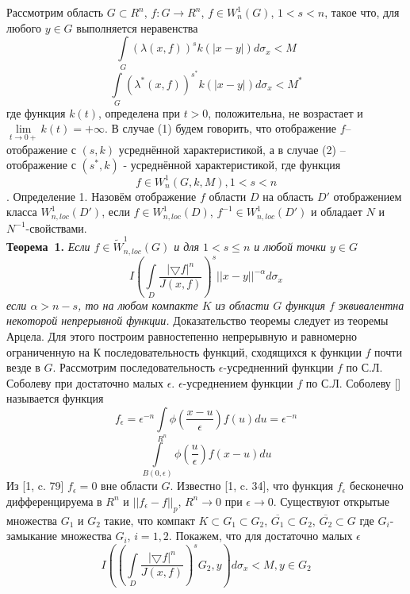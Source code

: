 Рассмотрим область $G\subset R^n$, $f:G\to R^n$, $f\in W^{1}_{n}(G)$, $1<s<n$, такое что, для любого $y\in G$ выполняется неравенства
\begin{equation}
\int\limits_{G}(\lambda(x,f))^{s}k(|x-y|)d\sigma_{x}<M
\end{equation}
\begin{equation}
\int\limits_{G}(\lambda^{*}(x,f))^{s^{*}}k(|x-y|)d\sigma_{x}<M^{*}
\end{equation}
где функция $k(t)$, определена при $t>0$, положительна, не возрастает и $\lim\limits_{t\to 0+}k(t)=+\infty$. В случае (1) будем говорить, что отображение $f$– отображение с $(s,k)$ усреднённой характеристикой, а в случае (2) – отображение с $(s^{*},k)$ - усреднённой характеристикой, где функция $$f\in W^{1}_{n}(G,k,M), 1<s<n$$.
Определение 1. Назовём отображение $f$ области $D$ на область $D'$ отображением класса $W^{1}_{n,loc}(D')$, если $f \in W^{1}_{n,loc}(D)$, $f^{-1} \in W^{1}_{n,loc}(D')$ и обладает $N$ и $N^{-1}$-свойствами.\\
\textbf{Теорема~1.} {\it Если $f\in\widetilde{W}_{n,loc}^1(G) $ и для $1<s\leq n$ и любой точки $y\in G$
\begin{equation}
I\left(
\int\limits_D\frac{|\bigtriangledown f|^{n}}{J(x,f)}
\right)^{s}||x-y||^{-\alpha}d\sigma_{x}
\end{equation}
если $\alpha>n-s$, то на любом компакте $K$ из области $G$ функция $f$ эквивалентна некоторой непрерывной функции.} Доказательство теоремы следует из теоремы Арцела. Для этого построим равностепенно непрерывную и равномерно ограниченную на $К$ последовательность функций, сходящихся к функции $f$ почти везде в $G$. Рассмотрим последовательность $\epsilon$-усредненний функции $f$ по С.Л. Соболеву при достаточно малых $\epsilon$. $\epsilon$-усреднением функции $f$ по С.Л. Соболеву [] называется функция
$$
f_{\epsilon}=\epsilon^{-n}\int\limits_{R^n}\phi\left(\frac{x-u}{\epsilon}\right)f(u)du=\epsilon^{-n}$$
$$\int\limits_{B(0,\epsilon)}\phi\left(\frac{u}{\epsilon}\right)f(x-u)du
$$
Из [1, c. 79] $f_{\epsilon}=0$ вне области $G$. Известно [1, c. 34], что функция $f_{\epsilon}$ бесконечно дифференцируема в $R^n$ и $||f_{\epsilon}-f||_p$, $R^{n}\to 0$ при $\epsilon\to 0$. Существуют открытые множества $G_1$ и $G_2$ такие, что компакт $K\subset G_{1} \subset G_{2}$, $\overline{G_1}\subset G_{2}$, $\overline{G_2}\subset G$ где $G_i$- замыкание множества $G_i$, $i=1,2$.
 	Покажем, что для достаточно малых $\epsilon$
 	$$I\left(\left(
\int\limits_D\frac{|\bigtriangledown f|^{n}}{J(x,f)}
\right)^{s}G_{2},y\right) d\sigma_{x}<M, y\in G_2$$
